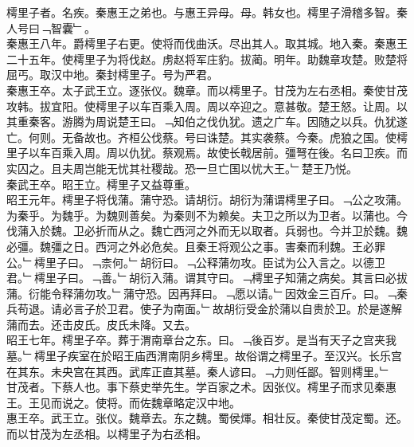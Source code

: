 \documentclass{zhvt-classic}
\begin{document}

\hspace*{2em}樗里子者。名疾。秦惠王之弟也。与惠王异母。母。韩女也。樗里子滑稽多智。秦人号曰﹁智囊﹂。\\
\hspace*{2em}秦惠王八年。爵樗里子右更。使将而伐曲沃。尽出其人。取其城。地入秦。秦惠王二十五年。使樗里子为将伐赵。虏赵将军庄豹。拔蔺。明年。助魏章攻楚。败楚将屈丐。取汉中地。秦封樗里子。号为严君。\\
\hspace*{2em}秦惠王卒。太子武王立。逐张仪。魏章。而以樗里子。甘茂为左右丞相。秦使甘茂攻韩。拔宜阳。使樗里子以车百乘入周。周以卒迎之。意甚敬。楚王怒。让周。以其重秦客。游腾为周说楚王曰。﹁知伯之伐仇犹。遗之广车。因随之以兵。仇犹遂亡。何则。无备故也。齐桓公伐蔡。号曰诛楚。其实袭蔡。今秦。虎狼之国。使樗里子以车百乘入周。周以仇犹。蔡观焉。故使长戟居前。彊弩在後。名曰卫疾。而实囚之。且夫周岂能无忧其社稷哉。恐一旦亡国以忧大王。﹂楚王乃悦。\\
\hspace*{2em}秦武王卒。昭王立。樗里子又益尊重。\\
\hspace*{2em}昭王元年。樗里子将伐蒲。蒲守恐。请胡衍。胡衍为蒲谓樗里子曰。﹁公之攻蒲。为秦乎。为魏乎。为魏则善矣。为秦则不为赖矣。夫卫之所以为卫者。以蒲也。今伐蒲入於魏。卫必折而从之。魏亡西河之外而无以取者。兵弱也。今并卫於魏。魏必彊。魏彊之日。西河之外必危矣。且秦王将观公之事。害秦而利魏。王必罪公。﹂樗里子曰。﹁柰何。﹂胡衍曰。﹁公释蒲勿攻。臣试为公入言之。以德卫君。﹂樗里子曰。﹁善。﹂胡衍入蒲。谓其守曰。﹁樗里子知蒲之病矣。其言曰必拔蒲。衍能令释蒲勿攻。﹂蒲守恐。因再拜曰。﹁愿以请。﹂因效金三百斤。曰。﹁秦兵苟退。请必言子於卫君。使子为南面。﹂故胡衍受金於蒲以自贵於卫。於是遂解蒲而去。还击皮氏。皮氏未降。又去。\\
\hspace*{2em}昭王七年。樗里子卒。葬于渭南章台之东。曰。﹁後百岁。是当有天子之宫夹我墓。﹂樗里子疾室在於昭王庙西渭南阴乡樗里。故俗谓之樗里子。至汉兴。长乐宫在其东。未央宫在其西。武库正直其墓。秦人谚曰。﹁力则任鄙。智则樗里。﹂\\
\hspace*{2em}甘茂者。下蔡人也。事下蔡史举先生。学百家之术。因张仪。樗里子而求见秦惠王。王见而说之。使将。而佐魏章略定汉中地。\\
\hspace*{2em}惠王卒。武王立。张仪。魏章去。东之魏。蜀侯煇。相壮反。秦使甘茂定蜀。还。而以甘茂为左丞相。以樗里子为右丞相。\\
\end{document}
